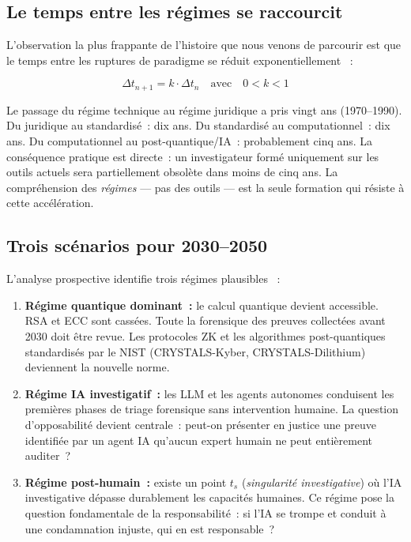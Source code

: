 \subsection{Le temps entre les régimes se raccourcit}

L'observation la plus frappante de l'histoire que nous venons de parcourir
est que le temps entre les ruptures de paradigme se réduit
exponentiellement \cite{chap2pdf}~:

\begin{equation}
\Delta t_{n+1} = k \cdot \Delta t_n \quad \text{avec} \quad 0 < k < 1
\label{eq:acceleration}
\end{equation}

Le passage du régime technique au régime juridique a pris vingt ans (1970--1990).
Du juridique au standardisé~: dix ans. Du standardisé au computationnel~: dix
ans. Du computationnel au post-quantique/IA~: probablement cinq ans. La
conséquence pratique est directe~: un investigateur formé uniquement sur les
outils actuels sera partiellement obsolète dans moins de cinq ans. La
compréhension des \emph{régimes} --- pas des outils --- est la seule
formation qui résiste à cette accélération.

\subsection{Trois scénarios pour 2030--2050}

L'analyse prospective identifie trois régimes plausibles \cite{chap2pdf}~:

\begin{enumerate}
    \item \textbf{Régime quantique dominant~:} le calcul quantique devient
          accessible. RSA et ECC sont cassées. Toute la forensique des preuves
          collectées avant 2030 doit être revue. Les protocoles ZK et les
          algorithmes post-quantiques standardisés par le NIST (CRYSTALS-Kyber,
          CRYSTALS-Dilithium) deviennent la nouvelle norme.

    \item \textbf{Régime IA investigatif~:} les LLM et les agents autonomes
          conduisent les premières phases de triage forensique sans intervention
          humaine. La question d'opposabilité devient centrale~: peut-on présenter
          en justice une preuve identifiée par un agent IA qu'aucun expert humain
          ne peut entièrement auditer~?

    \item \textbf{Régime post-humain~:} existe un point $t_s$ (\textit{singularité
          investigative}) où l'IA investigative dépasse durablement les capacités
          humaines. Ce régime pose la question fondamentale de la responsabilité~:
          si l'IA se trompe et conduit à une condamnation injuste, qui en est
          responsable~?
\end{enumerate}


